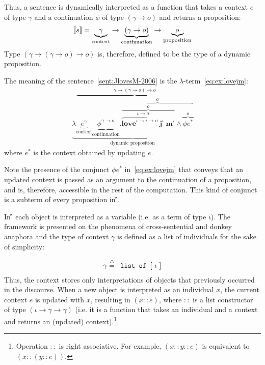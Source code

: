 Thus, a sentence is dynamically interpreted as a function that takes a context $e$ of type $\gamma$ and a continuation $\phi$ of type $(\gamma \rightarrow o)$ and returns a proposition: %
\begin{align}
[\![s]\!] = \underbrace{\gamma}_{\text{context}} \rightarrow \underbrace{(\gamma \rightarrow o)}_{\text{continuation}} \rightarrow \underbrace{o}_{
\text{proposition}} \notag
\end{align}
Type $(\gamma \rightarrow (\gamma \rightarrow o) \rightarrow o)$ is, therefore, defined to be the type of a dynamic proposition.
 
\begin{example} \label{ex:2006-jlm} The meaning of the sentence~\eqref{sent:JlovesM-2006} is the $\lambda$-term~\eqref{eq:ex:lovejm}:
\begin{align}
\underbrace{\lambda \overbrace{\underbrace{e^{\gamma}}_{\text{context}} \underbrace{\phi^{\gamma \rightarrow o}}_{\text{continuation}}.  \overbrace{\overbrace{ \overbrace{\textbf{love}^{\iota \rightarrow \iota \rightarrow o}  \ \textbf{j}^{\iota}}^{\iota \rightarrow o} \ \textbf{m}^{\iota}}^{o} \land \overbrace{\phi e^*}^{o}}^{o}}^{\gamma \rightarrow (\gamma \rightarrow o) \rightarrow o} }_{\text{dynamic proposition}} \label{eq:ex:lovejm}
\end{align}
where  $e^*$ is the context obtained by updating $e$.
\end{example}

Note the presence of the conjunct $\phi e^*$ in~\eqref{eq:ex:lovejm} that conveys that an updated context is passed as an argument to the continuation of a proposition, and is, therefore, accessible in the rest of the computation.  This kind of conjunct is a subterm of every proposition in {\G}.

In {\G} each object is interpreted as a variable (i.e. as a term of type $\iota$). The framework is presented on the phenomena of cross-sentential and donkey anaphora and the type of context $\gamma$ is defined as a list of individuals for the sake of simplicity:

\begin{align}
\gamma \stackrel{{\scriptstyle\triangle}}{=} \texttt{ list of } [ \ \iota \ ] 
\end{align}
Thus, the context stores only interpretations of objects that previously occurred in the discourse. When a new object is interpreted as an individual $x$, the current context $e$ is updated with $x$, resulting in $(x::e)$, where $::$ is a list constructor of type $(\iota \rightarrow \gamma \rightarrow \gamma)$ (i.e. it is a function that takes an individual and a context and returns an (updated) context).\footnote{Operation $::$ is right associative. For example, $(x::y::e)$ is equivalent to $(x::(y::e))$.}

